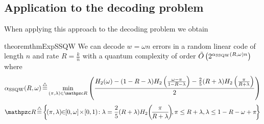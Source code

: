 \subsection{Application to the decoding problem}
When applying this approach to the decoding problem we obtain
\begin{restatable}{theorem}{thmExpSSQW}
\label{th:expSSQW}
We can decode $w=\omega n$ errors in a random linear code of length $n$ and rate $R=\frac{k}{n}$  with a quantum complexity of
order $\tilde{O}\left( 2^{\alpha_{\text{SSQW}}(R,\omega)n} \right)$ where 
$$
\alpha_{\text{SSQW}}(R, \omega) \eqdef \min_{(\pi,\lambda) \in \zR} \left(\frac{H_2(\omega) - (1-R-\lambda)H_2\left(\frac{\omega - \pi}{1 - R - \lambda}\right) - \frac{2}{5}(R+\lambda)H_2\left(\frac{\pi}{R+\lambda}\right)}{2} \right)$$
$$
\zR  \eqdef  \left\{\!(\pi,\lambda)\!\!\in\!\![0,\omega]\!\times\![0,1)\!:\lambda = \frac{2}{5}(R+\lambda)H_2\!\left(\!\frac{\pi}{R+\lambda}\!\right)\!\!,
\pi \leq R + \lambda, \lambda \leq 1-R-\omega+\pi \! \right\}
$$
\end{restatable}
